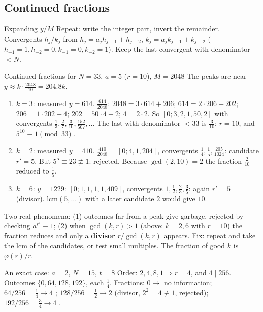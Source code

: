 \documentclass[11pt,a4paper,openany]{book}
\newcounter{wex}[chapter]
\newenvironment{steps}{\begin{enumerate}[label=\textbf{Step \arabic*.}, leftmargin=4.2em, itemsep=2pt]}{\end{enumerate}}
\begin{document}
\subsection{Continued fractions}
\begin{method}{Expanding $y/M$}
Repeat: write the integer part, invert the remainder. Convergents $h_j/k_j$ from $h_j = a_jh_{j-1} + h_{j-2}$,
$k_j = a_jk_{j-1} + k_{j-2}$ ($h_{-1} = 1, h_{-2} = 0, k_{-1} = 0, k_{-2} = 1$). Keep the last convergent with denominator $< N$.
\end{method}
\begin{wexample}{Continued fractions for $N = 33$, $a = 5$ ($r = 10$), $M = 2048$}
The peaks are near $y \approx k\cdot\frac{2048}{10} = 204.8k$.
\begin{steps}
\item $k = 3$: measured $y = 614$. $\frac{614}{2048}$: $2048 = 3\cdot614 + 206$; $614 = 2\cdot206 + 202$; $206 = 1\cdot202 + 4$; $202 = 50\cdot4 + 2$; $4 = 2\cdot2$.
      So $[0; 3, 2, 1, 50, 2]$ with convergents $\frac13, \frac27, \frac{3}{10}, \frac{152}{507}, \dots$ The last with denominator $< 33$ is $\frac{3}{10}$: $r = 10$, and
      $5^{10} \equiv 1 \pmod{33}$ \checkmark.
\item $k = 2$: measured $y = 410$. $\frac{410}{2048} = [0; 4, 1, 204]$, convergents $\frac14, \frac15, \frac{205}{1024}$: candidate $r' = 5$. But $5^5 \equiv 23 \not\equiv 1$:
      rejected. Because $\gcd(2, 10) = 2$ the fraction $\frac{2}{10}$ reduced to $\frac15$.
\item $k = 6$: $y = 1229$: $[0;1,1,1,1,409]$, convergents $1, \frac12, \frac23, \frac35$: again $r' = 5$ (divisor). lcm$(5, \dots)$ with a later
      candidate $2$ would give $10$.
\end{steps}
\end{wexample}
Two real phenomena: (1) outcomes far from a peak give garbage, rejected by checking $a^{r'} \equiv 1$;
(2) when $\gcd(k, r) > 1$ (above: $k = 2, 6$ with $r = 10$) the fraction reduces and only a \textbf{divisor} $r/\gcd(k,r)$ appears. Fix: repeat
and take the lcm of the candidates, or test small multiples. The fraction of good $k$ is $\varphi(r)/r$.

\begin{wexample}{An exact case: $a = 2$, $N = 15$, $t = 8$}
Order: $2, 4, 8, 1 \Rightarrow r = 4$, and $4 \mid 256$. Outcomes $\{0, 64, 128, 192\}$, each $\frac14$. Fractions: $0 \to$ no information;
$64/256 = \frac14 \to 4$ \checkmark; $128/256 = \frac12 \to 2$ (divisor, $2^2 = 4 \not\equiv 1$, rejected); $192/256 = \frac34 \to 4$ \checkmark.
\end{wexample}
\end{document}
